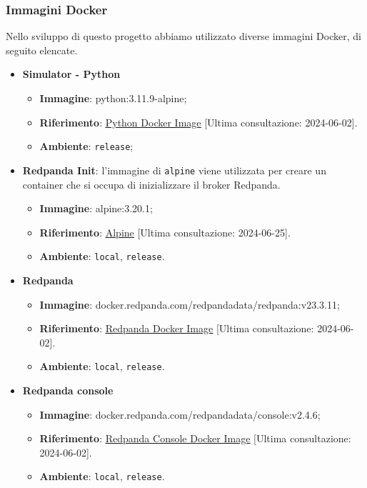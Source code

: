 \subsubsection{Immagini Docker}
Nello sviluppo di questo progetto abbiamo utilizzato diverse immagini Docker, di seguito elencate.
\begin{itemize}
	\item \textbf{Simulator - Python}
	      \begin{itemize}
		      \item \textbf{Immagine}: python:3.11.9-alpine;
		      \item \textbf{Riferimento}: \underline{\href{https://hub.docker.com/_/python}{Python Docker Image}} [Ultima consultazione: 2024-06-02].
		      \item \textbf{Ambiente}: \texttt{release};
	      \end{itemize}

	\item \textbf{Redpanda Init}:
	      l'immagine di \texttt{alpine} viene utilizzata per creare un container che si occupa di inizializzare il broker Redpanda.
	      \begin{itemize}
		      \item \textbf{Immagine}: alpine:3.20.1;
		      \item \textbf{Riferimento}: \underline{\href{https://hub.docker.com/_/alpine}{Alpine}} [Ultima consultazione: 2024-06-25].
		      \item \textbf{Ambiente}: \texttt{local}, \texttt{release}.
	      \end{itemize}

	\item \textbf{Redpanda}
	      \begin{itemize}
		      \item \textbf{Immagine}: docker.redpanda.com/redpandadata/redpanda:v23.3.11;
		      \item \textbf{Riferimento}: \underline{\href{https://hub.docker.com/r/redpandadata/redpanda}{Redpanda Docker Image}} [Ultima consultazione: 2024-06-02].
		      \item \textbf{Ambiente}: \texttt{local}, \texttt{release}.
	      \end{itemize}

	\item \textbf{Redpanda console}
	      \begin{itemize}
		      \item \textbf{Immagine}: docker.redpanda.com/redpandadata/console:v2.4.6;
		      \item \textbf{Riferimento}: \underline{\href{https://hub.docker.com/r/redpandadata/redpanda}{Redpanda Console Docker Image}} [Ultima consultazione: 2024-06-02].
		      \item \textbf{Ambiente}: \texttt{local}, \texttt{release}.
	      \end{itemize}


\end{itemize}
